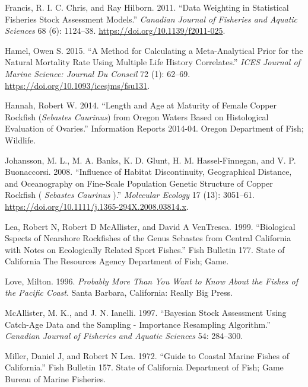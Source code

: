 \documentclass[11pt,
  english,
  a4paper,
]{article}
\begin{document}
\begin{cslreferences}
\leavevmode\hypertarget{ref-francis_data_2011}{}%
Francis, R. I. C. Chris, and Ray Hilborn. 2011. ``Data Weighting in Statistical Fisheries Stock Assessment Models.'' \emph{Canadian Journal of Fisheries and Aquatic Sciences} 68 (6): 1124--38. \url{https://doi.org/10.1139/f2011-025}.

\leavevmode\hypertarget{ref-hamel_method_2015}{}%
Hamel, Owen S. 2015. ``A Method for Calculating a Meta-Analytical Prior for the Natural Mortality Rate Using Multiple Life History Correlates.'' \emph{ICES Journal of Marine Science: Journal Du Conseil} 72 (1): 62--69. \url{https://doi.org/10.1093/icesjms/fsu131}.

\leavevmode\hypertarget{ref-hannah_length_2014}{}%
Hannah, Robert W. 2014. ``Length and Age at Maturity of Female Copper Rockfish (\emph{Sebastes Caurinus}) from Oregon Waters Based on Histological Evaluation of Ovaries.'' Information Reports 2014-04. Oregon Department of Fish; Wildlife.

\leavevmode\hypertarget{ref-johansson_influence_2008}{}%
Johansson, M. L., M. A. Banks, K. D. Glunt, H. M. Hassel-Finnegan, and V. P. Buonaccorsi. 2008. ``Influence of Habitat Discontinuity, Geographical Distance, and Oceanography on Fine-Scale Population Genetic Structure of Copper Rockfish ( \emph{Sebastes Caurinus} ).'' \emph{Molecular Ecology} 17 (13): 3051--61. \url{https://doi.org/10.1111/j.1365-294X.2008.03814.x}.

\leavevmode\hypertarget{ref-lea_biological_1999}{}%
Lea, Robert N, Robert D McAllister, and David A VenTresca. 1999. ``Biological Sspects of Nearshore Rockfishes of the Genus Sebastes from Central California with Notes on Ecologically Related Sport Fishes.'' Fish Bulletin 177. State of California The Resources Agency Department of Fish; Game.

\leavevmode\hypertarget{ref-love_milton_probably_1996}{}%
Love, Milton. 1996. \emph{Probably More Than You Want to Know About the Fishes of the Pacific Coast}. Santa Barbara, California: Really Big Press.

\leavevmode\hypertarget{ref-mcallister_bayesian_1997}{}%
McAllister, M. K., and J. N. Ianelli. 1997. ``Bayesian Stock Assessment Using Catch-Age Data and the Sampling - Importance Resampling Algorithm.'' \emph{Canadian Journal of Fisheries and Aquatic Sciences} 54: 284--300.

\leavevmode\hypertarget{ref-miller_guide_1972}{}%
Miller, Daniel J, and Robert N Lea. 1972. ``Guide to Coastal Marine Fishes of California.'' Fish Bulletin 157. State of California Department of Fish; Game Bureau of Marine Fisheries.


\end{cslreferences}
\end{document}
